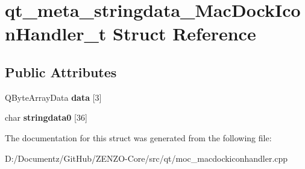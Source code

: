 \hypertarget{structqt__meta__stringdata___mac_dock_icon_handler__t}{}\section{qt\+\_\+meta\+\_\+stringdata\+\_\+\+Mac\+Dock\+Icon\+Handler\+\_\+t Struct Reference}
\label{structqt__meta__stringdata___mac_dock_icon_handler__t}
\subsection*{Public Attributes}
\begin{DoxyCompactItemize}
\item 
\mbox{\label{structqt__meta__stringdata___mac_dock_icon_handler__t_a41b91a9ad0a8194454d95b19308924a8}} 
Q\+Byte\+Array\+Data {\bfseries data} \mbox{[}3\mbox{]}
\item 
\mbox{\label{structqt__meta__stringdata___mac_dock_icon_handler__t_a175aea0034507896a2dda028ace97d08}} 
char {\bfseries stringdata0} \mbox{[}36\mbox{]}
\end{DoxyCompactItemize}


The documentation for this struct was generated from the following file\+:\begin{DoxyCompactItemize}
\item 
D\+:/\+Documentz/\+Git\+Hub/\+Z\+E\+N\+Z\+O-\/\+Core/src/qt/moc\+\_\+macdockiconhandler.\+cpp\end{DoxyCompactItemize}
